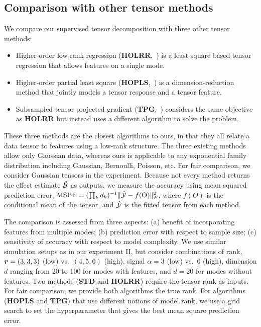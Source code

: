 \documentclass[12pt]{article}
\theoremstyle{definition}
\theoremstyle{definition}
\begin{document}
\subsection{Comparison with other tensor methods}
We compare our supervised tensor decomposition with three other tensor methods:
\begin{itemize}[noitemsep,topsep=0pt]
\item  Higher-order low-rank regression ({\bf HOLRR},~\citet{rabusseau2016low}) is a least-square based tensor regression that allows features on a single mode. 
\item Higher-order partial least square ({\bf HOPLS},~\citet{zhao2012higher}) is a dimension-reduction method that jointly models a tensor response and a tensor feature. 
\item Subsampled tensor projected gradient ({\bf TPG},~\citet{yu2016learning}) considers the same objective as {\bf HOLRR} but instead uses a different algorithm to solve the problem. 
\end{itemize}
These three methods are the closest algorithms to ours, in that they all relate a data tensor to features using a low-rank structure. The three existing methods allow only Gaussian data, whereas ours is applicable to any exponential family distribution including Gaussian, Bernoulli, Poisson, etc. For fair comparison, we consider Gaussian tensors in the experiment. Because not every method returns the effect estimate $\hat {\mathcal{B}}$ as outputs, we measure the accuracy using mean squared prediction error, $\text{MSPE}=(\prod_kd_k)^{-1}\lVert\hat {\mathcal{Y}}-f(\Theta)\rVert_F^2$, where $f(\Theta)$ is the conditional mean of the tensor, and $\hat {\mathcal{Y}}$ is the fitted tensor from each method. 

The comparison is assessed from three aspects: (a) benefit of incorporating features from multiple modes; (b) prediction error with respect to sample size; (c) sensitivity of accuracy with respect to model complexity. We use similar simulation setups as in our experiment II, but consider combinations of rank, $\bm{r}=(3,3,3)$ (low) vs.\ $(4,5,6)$ (high), signal $\alpha = 3$ (low) vs.\ $6$ (high), dimension $d$ ranging from 20 to 100 for modes with features, and $d = 20$ for modes without features. Two methods ({\bf STD} and {\bf HOLRR}) require the tensor rank as inputs. For fair comparison, we provide both algorithms the true rank. For algorithms ({\bf HOPLS} and {\bf TPG}) that use different notions of model rank, we use a grid search to set the hyperparameter that gives the best mean square prediction error.
\end{document}
